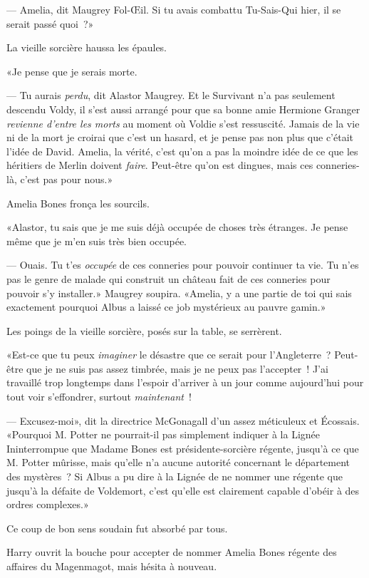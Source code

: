 --- Amelia, dit Maugrey Fol-Œil. Si tu avais combattu Tu-Sais-Qui hier, il se serait passé quoi~?»

La vieille sorcière haussa les épaules.

«Je pense que je serais morte.

--- Tu aurais \emph{perdu}, dit Alastor Maugrey. Et le Survivant n'a pas seulement descendu Voldy, il s'est aussi arrangé pour que sa bonne amie Hermione Granger \emph{revienne d'entre les morts} au moment où Voldie s'est ressuscité. Jamais de la vie ni de la mort je croirai que c'est un hasard, et je pense pas non plus que c'était l'idée de David. Amelia, la vérité, c'est qu'on a pas la moindre idée de ce que les héritiers de Merlin doivent \emph{faire}. Peut-être qu'on est dingues, mais ces conneries-là, c'est pas pour nous.»

Amelia Bones fronça les sourcils.

«Alastor, tu sais que je me suis déjà occupée de choses très étranges. Je pense même que je m'en suis très bien occupée.

--- Ouais. Tu t'es \emph{occupée} de ces conneries pour pouvoir continuer ta vie. Tu n'es pas le genre de malade qui construit un château fait de ces conneries pour pouvoir s'y installer.» Maugrey soupira. «Amelia, y a une partie de toi qui sais exactement pourquoi Albus a laissé ce job mystérieux au pauvre gamin.»

Les poings de la vieille sorcière, posés sur la table, se serrèrent.

«Est-ce que tu peux \emph{imaginer} le désastre que ce serait pour l'Angleterre~? Peut-être que je ne suis pas assez timbrée, mais je ne peux pas l'accepter~! J'ai travaillé trop longtemps dans l'espoir d'arriver à un jour comme aujourd'hui pour tout voir s'effondrer, surtout \emph{maintenant}~!

--- Excusez-moi», dit la directrice McGonagall d'un assez méticuleux et Écossais. «Pourquoi M. Potter ne pourrait-il pas simplement indiquer à la Lignée Ininterrompue que Madame Bones est présidente-sorcière régente, jusqu'à ce que M. Potter mûrisse, mais qu'elle n'a aucune autorité concernant le département des mystères~? Si Albus a pu dire à la Lignée de ne nommer une régente que jusqu'à la défaite de Voldemort, c'est qu'elle est clairement capable d’obéir à des ordres complexes.»

Ce coup de bon sens soudain fut absorbé par tous.

Harry ouvrit la bouche pour accepter de nommer Amelia Bones régente des affaires du Magenmagot, mais hésita à nouveau.

